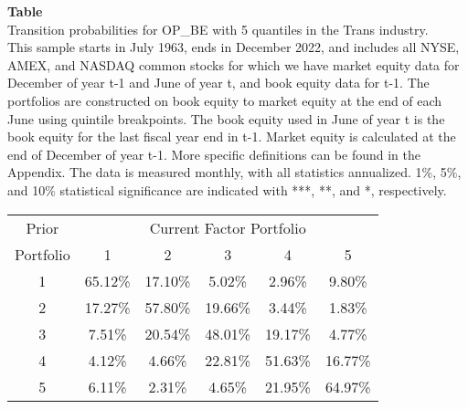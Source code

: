 \begin{table*}[ht!]
\raggedright
{}
\label{tab: transition_probs_OP_BE_Trans_with_5_quantiles}
\textbf{Table \thetable} \\
Transition probabilities for OP_BE with 5 quantiles in the Trans industry. \\
\hspace*{1em}This sample starts in July 1963, ends in December 2022, and includes all NYSE, AMEX, and NASDAQ common stocks for which we have market equity data for December of year t-1 and June of year t, and book equity data for t-1. The portfolios are constructed on book equity to market equity at the end of each June using quintile breakpoints.  The book equity used in June of year t is the book equity for the last fiscal year end in t-1.  Market equity is calculated at the end of December of year t-1.  More specific definitions can be found in the Appendix.  The data is measured monthly, with all statistics annualized.  1\%, 5\%, and 10\% statistical significance are indicated with ***, **, and *, respectively. \\
\vspace{0.5em}
\centering
\begin{adjustbox}{max width=\textwidth}
\begin{tabular}{@{}cccccc@{}}
\toprule
Prior & \multicolumn{5}{c}{Current Factor Portfolio} \\
Portfolio & 1 & 2 & 3 & 4 & 5 \\
\midrule
1 & 65.12\% & 17.10\% & 5.02\% & 2.96\% & 9.80\% \\
2 & 17.27\% & 57.80\% & 19.66\% & 3.44\% & 1.83\% \\
3 & 7.51\% & 20.54\% & 48.01\% & 19.17\% & 4.77\% \\
4 & 4.12\% & 4.66\% & 22.81\% & 51.63\% & 16.77\% \\
5 & 6.11\% & 2.31\% & 4.65\% & 21.95\% & 64.97\% \\
\bottomrule
\end{tabular}
\end{adjustbox}
\end{table*}